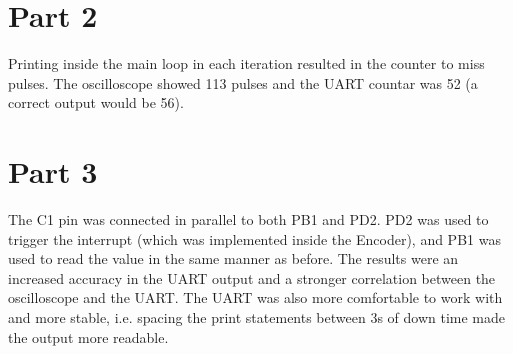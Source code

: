 \documentclass{article}
\begin{document}
\section*{Part 2}
Printing inside the main loop in each iteration resulted in the counter to miss pulses.
The oscilloscope showed 113 pulses and the UART countar was 52 (a correct output would be
56).

\section*{Part 3}
The C1 pin was connected in parallel to both PB1 and PD2. PD2 was used to trigger the
interrupt (which was implemented inside the Encoder), and PB1 was used to read the value
in the same manner as before. The results were an increased accuracy in the UART output
and a stronger correlation between the oscilloscope and the UART. The UART was also more
comfortable to work with and more stable, i.e. spacing the print statements between 3s of
down time made the output more readable.

\end{document}
